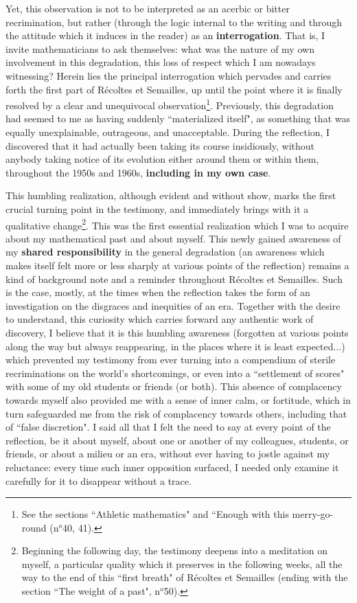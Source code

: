 Yet, this observation is not to be interpreted as an acerbic or bitter recrimination, but rather (through the logic internal to the writing and through the attitude which it induces in the reader) as an \textbf{interrogation}. That is, I invite mathematicians to ask themselves: what was the nature of my own involvement in this degradation, this loss of respect which I am nowadays witnessing? Herein lies the principal interrogation which pervades and carries forth the first part of R\'ecoltes et Semailles, up until the point where it is finally resolved by a clear and unequivocal observation\footnote{See the sections ``Athletic mathematics" and ``Enough with this merry-go-round (n$^o$40, 41).}. Previously, this degradation had seemed to me as having suddenly ``materialized itself", as something that was equally unexplainable, outrageous, and unacceptable. During the reflection, I discovered that it had actually been taking its course insidiously, without anybody taking notice of its evolution either around them or within them, throughout the 1950s and 1960s, \textbf{including in my own case}. 

This humbling realization, although evident and without show, marks the first crucial turning point in the testimony, and immediately brings with it a qualitative change\footnote{Beginning the following day, the testimony deepens into a meditation on myself, a particular quality which it preserves in the following weeks, all the way to the end of this ``first breath" of R\'ecoltes et Semailles (ending with the section ``The weight of a past", n$^o$50).}. This was the first essential realization which I was to acquire about my mathematical past and about myself. This newly gained awareness of my \textbf{shared responsibility} in the general degradation (an awareness which makes itself felt more or less sharply at various points of the reflection) remains a kind of background note and a reminder throughout R\'ecoltes et Semailles. Such is the case, mostly, at the times when the reflection takes the form of an investigation on the disgraces and inequities of an era. Together with the desire to understand, this curiosity which carries forward any authentic work of discovery, I believe that it is this humbling awareness (forgotten at various points along the way but always reappearing, in the places where it is least expected...) which prevented my testimony from ever turning into a compendium of sterile recriminations on the world's shortcomings, or even into a ``settlement of scores" with some of my old students or friends (or both). This absence of complacency towards myself also provided me with a sense of inner calm, or fortitude, which in turn safeguarded me from the risk of complacency towards others, including that of ``false discretion". I said all that I felt the need to say at every point of the reflection, be it about myself, about one or another of my colleagues, students, or friends, or about a milieu or an era, without ever having to jostle against my reluctance: every time such inner opposition surfaced, I needed only examine it carefully for it to disappear without a trace.

